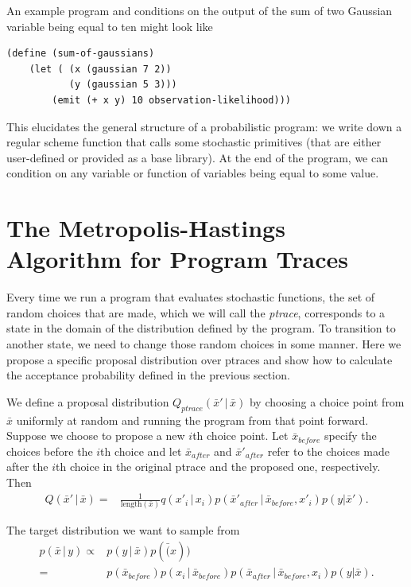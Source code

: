 \documentclass{article}
\newcommand{\given}{\, |\,}
\begin{document}
An example program and conditions on the output of the sum of two Gaussian
variable being equal to ten might look like

\begin{verbatim}
(define (sum-of-gaussians)
    (let ( (x (gaussian 7 2))
           (y (gaussian 5 3)))
        (emit (+ x y) 10 observation-likelihood)))
\end{verbatim}

This elucidates the general structure of a probabilistic program: we write down
a regular scheme function that calls some stochastic primitives (that are either
user-defined or provided as a base library). At the end of the program, we can
condition on any variable or function of variables being equal to some value. 

\section{The Metropolis-Hastings Algorithm for Program Traces}
Every time we run a program that evaluates stochastic functions, the set of
random choices that are made, which we will call the \emph{ptrace}, corresponds
to a state in the domain of the distribution defined by the program. To
transition to another state, we need to change those random choices in some
manner. Here we propose a specific proposal distribution over ptraces and show
how to calculate the acceptance probability defined in the previous section. 

We define a proposal distribution $Q_{ptrace}(\bar{x}'\given \bar{x} )$ by
choosing a choice point from $\bar{x}$ uniformly at random and running the program
from that point forward. Suppose we choose to propose a new $i$th choice point.
Let $\bar{x}_{before}$ specify the choices before the $i$th choice and let
$\bar{x}_{after}$ and $\bar{x}'_{after}$ refer to the choices made after the
$i$th choice in the original ptrace and the proposed one, respectively. Then
\begin{align}
Q(\bar{x}' \given \bar{x}) =& \frac{1}{\text{length}(\bar{x})} 
                            q(x'_i \given x_i) p(\bar{x}'_{after} \given
                            \bar{x}_{before}, x'_i)
                            p(y | \bar{x}').
\end{align}

The target distribution we want to sample from 
\begin{align}
p(\bar{x} \given y) \propto & p(y \given \bar{x}) p(\bar(x))\\
                    =& p(\bar{x}_{before}) p(x_i \given \bar{x}_{before})
                    p(\bar{x}_{after} \given \bar{x}_{before}, x_i)
                    p(y|\bar{x}).
\end{align}
\end{document}
